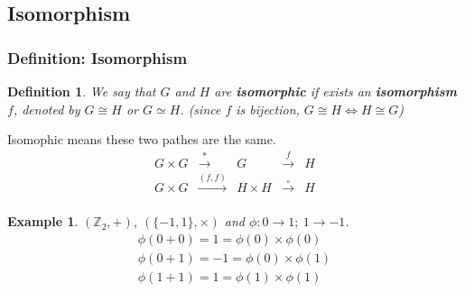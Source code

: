\documentclass[11pt,a4paper]{article}
\newtheorem{example}{Example}
\newtheorem{definition}{Definition}
\begin{document}
\subsection{Isomorphism}
\subsubsection{Definition: Isomorphism}
\begin{definition}
    We say that $G$ and $H$ are \textbf{isomorphic} if exists an \textbf{isomorphism} $f$, denoted by $G\cong H$ or $G\simeq H$. (since $f$ is bijection, $G\cong H\Leftrightarrow H\cong G$)
\end{definition}


Isomophic means these two pathes are the same.
\begin{equation}
    \begin{aligned}
        G\times G& \stackrel{*}{\longrightarrow} & G &\stackrel{f}{\longrightarrow}& H\\
        G\times G& \stackrel{(f,f)}{\longrightarrow} &H\times H & \stackrel{\circ}{\longrightarrow}& H\\
    \end{aligned}
    \nonumber
\end{equation}

\begin{example}
    $(\mathbb{Z}_2,+)$, $(\{-1,1\},\times)$ and $\phi: 0 \rightarrow 1;\ 1 \rightarrow -1$.
    \begin{equation}
        \begin{aligned}
            \phi(0+0)=1=\phi(0)\times\phi(0)\\
            \phi(0+1)=-1=\phi(0)\times\phi(1)\\
            \phi(1+1)=1=\phi(1)\times\phi(1)\\
        \end{aligned}
        \nonumber
    \end{equation}
\end{example}
\end{document}
